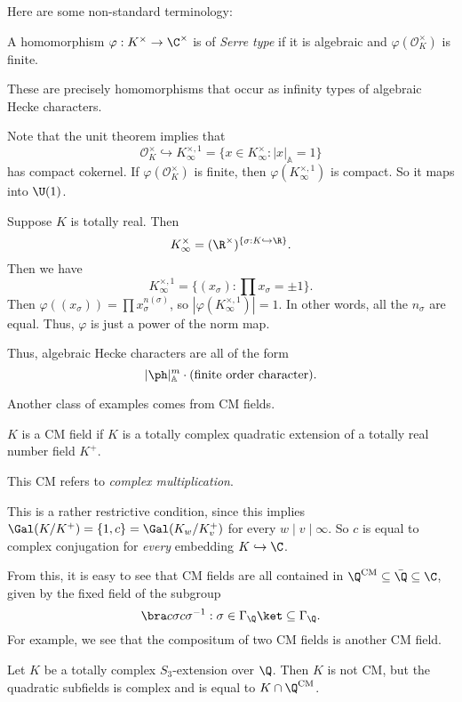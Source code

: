 \documentclass[a4paper]{article}
\newcommand\A{\mathbb{A}}
\newcommand\CM{\mathrm{CM}}
\begin{document}
Here are some non-standard terminology:
\begin{defi}
  A homomorphism $\varphi: K^\times \to \C^\times$ is of \emph{Serre type} if it is algebraic and $\varphi(\mathcal{O}_K^\times)$ is finite.
\end{defi}
These are precisely homomorphisms that occur as infinity types of algebraic Hecke characters.

Note that the unit theorem implies that
\[
  \mathcal{O}_K^\times \hookrightarrow K_\infty^{\times, 1} = \{x \in K_\infty^{\times} : |x|_{\A} = 1\}
\]
has compact cokernel. If $\varphi(\mathcal{O}_K^\times)$ is finite, then $\varphi(K_\infty^{\times, 1})$ is compact. So it maps into $\U(1)$.

\begin{eg}
  Suppose $K$ is totally real. Then
  \[
    K_\infty^\times = (\R^\times)^{\{\sigma: K \hookrightarrow \R\}}.
  \]
  Then we have
  \[
    K_\infty^{\times, 1} = \{(x_\sigma): \prod x_\sigma = \pm 1\}.
  \]
  Then $\varphi((x_\sigma)) = \prod x_\sigma^{n(\sigma)}$, so $|\varphi(K_\infty^{\times, 1})| = 1$. In other words, all the $n_\sigma$ are equal. Thus, $\varphi$ is just a power of the norm map.

  Thus, algebraic Hecke characters are all of the form
  \[
    |\ph |_\A^m \cdot (\text{finite order character}).
  \]
\end{eg}

Another class of examples comes from CM fields.
\begin{defi}[CM field]
  $K$ is a CM field if $K$ is a totally complex quadratic extension of a totally real number field $K^+$.
\end{defi}
This CM refers to \emph{complex multiplication}.

This is a rather restrictive condition, since this implies $\Gal(K/K^+) = \{1, c\} = \Gal(K_w /K_v^+)$ for every $w \mid v \mid \infty$. So $c$ is equal to complex conjugation for \emph{every} embedding $K \hookrightarrow \C$.

From this, it is easy to see that CM fields are all contained in $\Q^{\CM} \subseteq \bar{\Q} \subseteq \C$, given by the fixed field of the subgroup
\[
  \bra c \sigma c \sigma^{-1}: \sigma \in \Gamma_\Q\ket \subseteq \Gamma_\Q.
\]
For example, we see that the compositum of two CM fields is another CM field.

\begin{ex}
  Let $K$ be a totally complex $S_3$-extension over $\Q$. Then $K$ is not CM, but the quadratic subfields is complex and is equal to $K \cap \Q^{\CM}$.
\end{ex}
\end{document}
